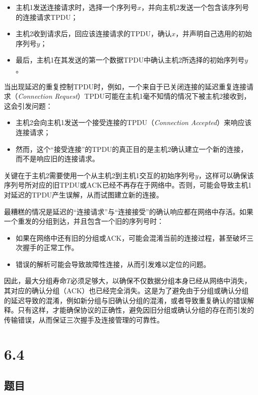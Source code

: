 \documentclass[14pt,a4paper,UTF8,twoside]{article}
\begin{document}
\begin{itemize}
    \item 主机1发送连接请求时，选择一个序列号$x$，并向主机2发送一个包含该序列号的连接请求TPDU；
    \item 主机2收到请求后，回应该连接请求的TPDU，确认$x$，并声明自己选用的初始序列号$y$；
    \item 最后，主机1在其发送的第一个数据TPDU中确认主机2所选择的初始序列号$y$。
\end{itemize}

\begin{ctt}
当出现延迟的重复控制TPDU时，例如，一个来自于已关闭连接的延迟重复连接请求（\textit{Connection Request}）TPDU可能在主机1毫不知情的情况下被主机2接收到，这会引发问题：
\begin{itemize}
    \item 主机2会向主机1发送一个接受连接的TPDU（\textit{Connection Accepted}）来响应该连接请求；
    \item 然而，这个“接受连接”的TPDU的真正目的是主机2确认建立一个新的连接，而不是响应旧的连接请求。
\end{itemize}

关键在于主机2需要使用一个从主机2到主机1交互的初始序列号$y$，这样可以确保该序列号所对应的旧TPDU或ACK已经不再存在于网络中。否则，可能会导致主机1对延迟的TPDU产生误解，从而试图建立新的连接。
\end{ctt}

最糟糕的情况是延迟的“连接请求”与“连接接受”的确认响应都在网络中存活。如果一个重发的分组到达，并且包含一个旧的序列号时：
\begin{itemize}
    \item 如果在网络中还有旧的分组或ACK，可能会混淆当前的连接过程，甚至破坏三次握手的正常工作。
    \item 错误的解析可能会导致故障性连接，从而引发难以定位的问题。
\end{itemize}

因此，最大分组寿命$T$必须足够大，以确保不仅数据分组本身已经从网络中消失，其对应的确认分组（ACK）也已经完全消失。这是为了避免由于分组或确认分组的延迟导致的混淆，例如新分组与旧确认分组的混淆，或者导致重复确认的错误解释。只有这样，才能确保协议的正确性，避免因旧分组或确认分组的存在而引发的传输错误，从而保证三次握手及连接管理的可靠性。

\section{6.4}

\subsection*{题目}
\end{document}

